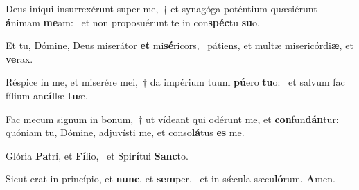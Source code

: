 \item Deus iníqui insurrexérunt super me,~† et synagóga poténtium quæsiérunt \textbf{á}nimam \textbf{me}am:~\psstar{} et non proposuérunt te in con\textbf{spéc}tu \textbf{su}o.

\item Et tu, Dómine, Deus miserátor \textbf{et} mi\textbf{sé}ricors,~\psstar{} pátiens, et multæ misericórdi\textbf{æ}, et \textbf{ve}rax.

\item Réspice in me, et miserére mei,~† da impérium tuum \textbf{pú}ero \textbf{tu}o:~\psstar{} et salvum fac fílium an\textbf{cíl}læ \textbf{tu}æ.

\item Fac mecum signum in bonum,~† ut vídeant qui odérunt me, et \textbf{con}fun\textbf{dán}tur:~\psstar{} quóniam tu, Dómine, adjuvísti me, et conso\textbf{lá}tus \textbf{es} me.

\item Glória \textbf{Pa}tri, et \textbf{Fí}lio,~\psstar{} et Spi\textbf{rí}tui \textbf{Sanc}to.

\item Sicut erat in princípio, et \textbf{nunc}, et \textbf{sem}per,~\psstar{} et in sǽcula sæcu\textbf{ló}rum. \textbf{A}men.